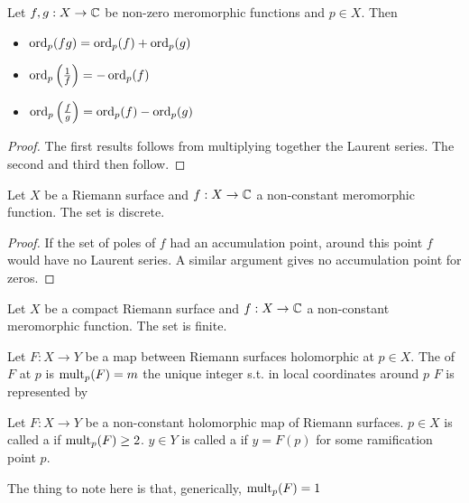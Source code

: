 \documentclass{article}
\begin{document}
\begin{lemma}
	Let $f,g : X \to \mathbb{C}$ be non-zero meromorphic functions and $p  \in X$. Then 
	\begin{itemize}
		\item $\operatorname{ord}_p(fg) = \operatorname{ord}_p(f) + \operatorname{ord}_p(g)$
		\item $\operatorname{ord}_p\left( \frac{1}{f} \right) = -\operatorname{ord}_p(f)$
		\item $\operatorname{ord}_p\left( \frac{f}{g} \right) = \operatorname{ord}_p(f) - \operatorname{ord}_p(g)$
	\end{itemize}
\end{lemma}
\begin{proof}
	The first results follows from multiplying together the Laurent series. The second and third then follow. 
\end{proof}

\begin{lemma}
	Let $X$ be a Riemann surface and $f:X \to \mathbb{C}$ a non-constant meromorphic function. The set
	is discrete.
\end{lemma}
\begin{proof}
	If the set of poles of $f$ had an accumulation point, around this point $f$ would have no Laurent series. A similar argument gives no accumulation point for zeros. 
\end{proof}

\begin{corollary}
	Let $X$ be a  compact Riemann surface and $f:X \to \mathbb{C}$ a non-constant meromorphic function. The set
	is finite.
\end{corollary}

\begin{definition}
	Let $F:X \to Y$ be a map between Riemann surfaces holomorphic at $p \in X$. The  of $F$ at $p$ is $\operatorname{mult}_p(F)=m$ the unique integer s.t. in local coordinates around $p$ $F$ is represented by 
\end{definition}

\begin{definition}
	Let $F:X \to Y$ be a non-constant holomorphic map of Riemann surfaces. $p \in X$ is called a  if $\operatorname{mult}_p(F) \geq 2$. $y\in Y$ is called a  if $y=F(p)$ for some ramification point $p$. 
\end{definition}

\begin{remark}
	The thing to note here is that, generically, $\operatorname{mult}_p(F) = 1$ 
\end{remark}
\end{document}
